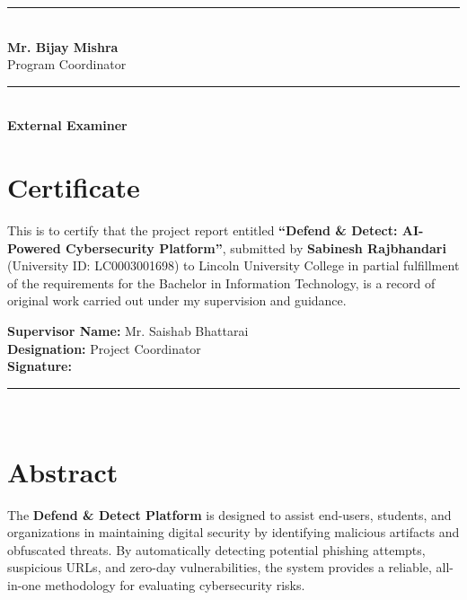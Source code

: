\documentclass[12pt,a4paper]{report}
\begin{document}
\vspace{2cm}

\noindent
\begin{minipage}{0.45\textwidth}
    \rule{6cm}{0.4pt}\\
    \textbf{Mr. Bijay Mishra}\\
    Program Coordinator
\end{minipage}
\hfill
\begin{minipage}{0.45\textwidth}
    \rule{6cm}{0.4pt}\\
    \textbf{External Examiner}\\
\end{minipage}

\newpage
\chapter*{Certificate}

This is to certify that the project report entitled \textbf{“Defend \& Detect: AI-Powered Cybersecurity Platform”}, submitted by \textbf{Sabinesh Rajbhandari} (University ID: LC0003001698) to Lincoln University College in partial fulfillment of the requirements for the Bachelor in Information Technology, is a record of original work carried out under my supervision and guidance.

\vspace{2cm}

\noindent
\textbf{Supervisor Name:} Mr. Saishab Bhattarai \\
\textbf{Designation:} Project Coordinator \\
\textbf{Signature:} \rule{5cm}{0.4pt} \\

\newpage
\chapter*{Abstract}

The \textbf{Defend \& Detect Platform} is designed to assist end-users, students, and organizations in maintaining digital security by identifying malicious artifacts and obfuscated threats. By automatically detecting potential phishing attempts, suspicious URLs, and zero-day vulnerabilities, the system provides a reliable, all-in-one methodology for evaluating cybersecurity risks.
\end{document}
